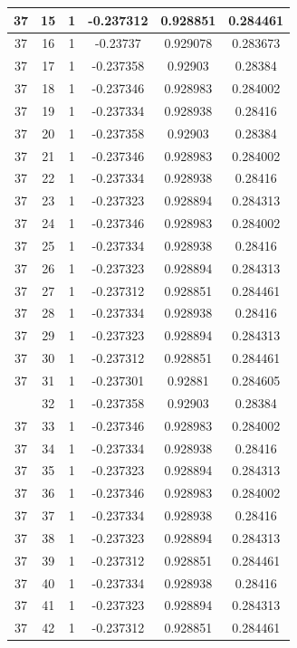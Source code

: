 \documentclass[12pt,a4paper]{article}
\numberwithin{equation}{section}
\numberwithin{figure}{section}
\numberwithin{table}{section}
\begin{document}
\begin{longtable}{|c|c|c|c|c|c|}
37 & 15 & 1 & -0.237312 & 0.928851 & 0.284461 \\ \hline
37 & 16 & 1 & -0.23737 & 0.929078 & 0.283673 \\ \hline
37 & 17 & 1 & -0.237358 & 0.92903 & 0.28384 \\ \hline
37 & 18 & 1 & -0.237346 & 0.928983 & 0.284002 \\ \hline
37 & 19 & 1 & -0.237334 & 0.928938 & 0.28416 \\ \hline
37 & 20 & 1 & -0.237358 & 0.92903 & 0.28384 \\ \hline
37 & 21 & 1 & -0.237346 & 0.928983 & 0.284002 \\ \hline
37 & 22 & 1 & -0.237334 & 0.928938 & 0.28416 \\ \hline
37 & 23 & 1 & -0.237323 & 0.928894 & 0.284313 \\ \hline
37 & 24 & 1 & -0.237346 & 0.928983 & 0.284002 \\ \hline
37 & 25 & 1 & -0.237334 & 0.928938 & 0.28416 \\ \hline
37 & 26 & 1 & -0.237323 & 0.928894 & 0.284313 \\ \hline
37 & 27 & 1 & -0.237312 & 0.928851 & 0.284461 \\ \hline
37 & 28 & 1 & -0.237334 & 0.928938 & 0.28416 \\ \hline
37 & 29 & 1 & -0.237323 & 0.928894 & 0.284313 \\ \hline
37 & 30 & 1 & -0.237312 & 0.928851 & 0.284461 \\ \hline
37 & 31 & 1 & -0.237301 & 0.92881 & 0.284605 \\ \hline
\pagebreak
37 & 32 & 1 & -0.237358 & 0.92903 & 0.28384 \\ \hline
37 & 33 & 1 & -0.237346 & 0.928983 & 0.284002 \\ \hline
37 & 34 & 1 & -0.237334 & 0.928938 & 0.28416 \\ \hline
37 & 35 & 1 & -0.237323 & 0.928894 & 0.284313 \\ \hline
37 & 36 & 1 & -0.237346 & 0.928983 & 0.284002 \\ \hline
37 & 37 & 1 & -0.237334 & 0.928938 & 0.28416 \\ \hline
37 & 38 & 1 & -0.237323 & 0.928894 & 0.284313 \\ \hline
37 & 39 & 1 & -0.237312 & 0.928851 & 0.284461 \\ \hline
37 & 40 & 1 & -0.237334 & 0.928938 & 0.28416 \\ \hline
37 & 41 & 1 & -0.237323 & 0.928894 & 0.284313 \\ \hline
37 & 42 & 1 & -0.237312 & 0.928851 & 0.284461 \\ \hline

\end{longtable}
\end{document}
